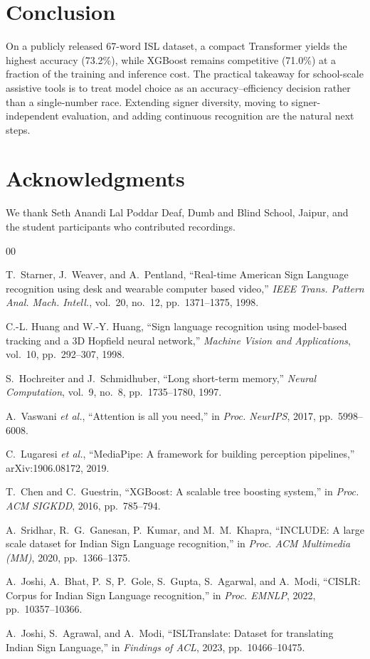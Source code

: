 \documentclass[conference]{IEEEtran}
\begin{document}
\section{Conclusion}
On a publicly released 67-word ISL dataset, a compact Transformer yields the highest accuracy (73.2\%), while XGBoost remains competitive (71.0\%) at a fraction of the training and inference cost. The practical takeaway for school-scale assistive tools is to treat model choice as an accuracy--efficiency decision rather than a single-number race. Extending signer diversity, moving to signer-independent evaluation, and adding continuous recognition are the natural next steps.

\section*{Acknowledgments}
We thank Seth Anandi Lal Poddar Deaf, Dumb and Blind School, Jaipur, and the student participants who contributed recordings.


\begin{thebibliography}{00}

T.~Starner, J.~Weaver, and A.~Pentland, ``Real-time American Sign Language recognition using desk and wearable computer based video,'' \emph{IEEE Trans. Pattern Anal. Mach. Intell.}, vol.~20, no.~12, pp.~1371--1375, 1998.

C.-L. Huang and W.-Y. Huang, ``Sign language recognition using model-based tracking and a 3D Hopfield neural network,'' \emph{Machine Vision and Applications}, vol.~10, pp.~292--307, 1998.

S.~Hochreiter and J.~Schmidhuber, ``Long short-term memory,'' \emph{Neural Computation}, vol.~9, no.~8, pp.~1735--1780, 1997.

A.~Vaswani \emph{et al.}, ``Attention is all you need,'' in \emph{Proc. NeurIPS}, 2017, pp.~5998--6008.

C.~Lugaresi \emph{et al.}, ``MediaPipe: A framework for building perception pipelines,'' arXiv:1906.08172, 2019.

T.~Chen and C.~Guestrin, ``XGBoost: A scalable tree boosting system,'' in \emph{Proc. ACM SIGKDD}, 2016, pp.~785--794.

A.~Sridhar, R.~G.~Ganesan, P.~Kumar, and M.~M.~Khapra, ``INCLUDE: A large scale dataset for Indian Sign Language recognition,'' in \emph{Proc. ACM Multimedia (MM)}, 2020, pp.~1366--1375.

A.~Joshi, A.~Bhat, P.~S, P.~Gole, S.~Gupta, S.~Agarwal, and A.~Modi, ``CISLR: Corpus for Indian Sign Language recognition,'' in \emph{Proc. EMNLP}, 2022, pp.~10357--10366.

A.~Joshi, S.~Agrawal, and A.~Modi, ``ISLTranslate: Dataset for translating Indian Sign Language,'' in \emph{Findings of ACL}, 2023, pp.~10466--10475.

\end{thebibliography}
\end{document}
